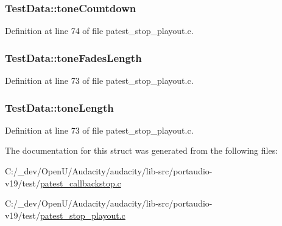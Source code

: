 \subsubsection[{\texorpdfstring{tone\+Countdown}{toneCountdown}}]{ Test\+Data\+::tone\+Countdown}\hypertarget{struct_test_data_aa24ad5a16f1884112a4662932f0e01fc}{}\label{struct_test_data_aa24ad5a16f1884112a4662932f0e01fc}


Definition at line 74 of file patest\+\_\+stop\+\_\+playout.\+c.

\subsubsection[{\texorpdfstring{tone\+Fades\+Length}{toneFadesLength}}]{ Test\+Data\+::tone\+Fades\+Length}\hypertarget{struct_test_data_ab0aa5b3d001f36b318435307d3b5a752}{}\label{struct_test_data_ab0aa5b3d001f36b318435307d3b5a752}


Definition at line 73 of file patest\+\_\+stop\+\_\+playout.\+c.

\subsubsection[{\texorpdfstring{tone\+Length}{toneLength}}]{ Test\+Data\+::tone\+Length}\hypertarget{struct_test_data_ab9ed9120bca939e812886794baf23db5}{}\label{struct_test_data_ab9ed9120bca939e812886794baf23db5}


Definition at line 73 of file patest\+\_\+stop\+\_\+playout.\+c.



The documentation for this struct was generated from the following files\+:\begin{DoxyCompactItemize}
\item 
C\+:/\+\_\+dev/\+Open\+U/\+Audacity/audacity/lib-\/src/portaudio-\/v19/test/\hyperlink{patest__callbackstop_8c}{patest\+\_\+callbackstop.\+c}\item 
C\+:/\+\_\+dev/\+Open\+U/\+Audacity/audacity/lib-\/src/portaudio-\/v19/test/\hyperlink{patest__stop__playout_8c}{patest\+\_\+stop\+\_\+playout.\+c}\end{DoxyCompactItemize}
